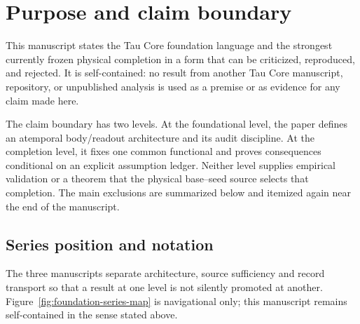\documentclass[11pt]{article}
\begin{document}
\clearpage
{\small\tableofcontents}
\clearpage

\section{Purpose and claim boundary}

This manuscript states the Tau Core foundation language and the strongest
currently frozen physical completion in a form that can be criticized,
reproduced, and rejected.  It is self-contained: no result from another Tau
Core manuscript, repository, or unpublished analysis is used as a premise or
as evidence for any claim made here.

The claim boundary has two levels.  At the foundational level, the paper
defines an atemporal body/readout architecture and its audit discipline.  At
the completion level, it fixes one common functional and proves consequences
conditional on an explicit assumption ledger.  Neither level supplies
empirical validation or a theorem that the physical base--seed source selects
that completion.  The main exclusions are summarized below and itemized again
near the end of the manuscript.

\begin{center}
\end{center}

\subsection*{Series position and notation}

The three manuscripts separate architecture, source sufficiency and record
transport so that a result at one level is not silently promoted at another.
Figure~\ref{fig:foundation-series-map} is navigational only; this manuscript
remains self-contained in the sense stated above.
\end{document}
